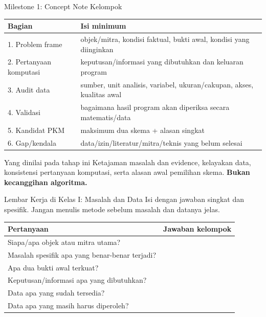 \documentclass[aspectratio=169,11pt]{beamer}
\begin{document}
\begin{frame}{Milestone 1: Concept Note Kelompok}
\small
\begin{center}
\begin{tabular}{p{4.0cm} p{9.0cm}}
\toprule
\textbf{Bagian} & \textbf{Isi minimum} \\
\midrule
1. Problem frame & objek/mitra, kondisi faktual, bukti awal, kondisi yang diinginkan \\
2. Pertanyaan komputasi & keputusan/informasi yang dibutuhkan dan keluaran program \\
3. Audit data & sumber, unit analisis, variabel, ukuran/cakupan, akses, kualitas awal \\
4. Validasi & bagaimana hasil program akan diperiksa secara matematis/data \\
5. Kandidat PKM & maksimum dua skema + alasan singkat \\
6. Gap/kendala & data/izin/literatur/mitra/teknis yang belum selesai \\
\bottomrule
\end{tabular}
\end{center}

\begin{alertblock}{Yang dinilai pada tahap ini}
\footnotesize
Ketajaman masalah dan evidence, kelayakan data, konsistensi pertanyaan komputasi, serta alasan awal pemilihan skema. \textbf{Bukan kecanggihan algoritma.}
\end{alertblock}
\end{frame}

\begin{frame}{Lembar Kerja di Kelas I: Masalah dan Data}
\footnotesize
Isi dengan jawaban singkat dan spesifik. Jangan menulis metode sebelum masalah dan datanya jelas.

\begin{center}
\renewcommand{\arraystretch}{1.15}
\begin{tabular}{p{5.2cm} p{7.7cm}}
\toprule
\textbf{Pertanyaan} & \textbf{Jawaban kelompok} \\
\midrule
Siapa/apa objek atau mitra utama? & \\
Masalah spesifik apa yang benar-benar terjadi? & \\
Apa dua bukti awal terkuat? & \\
Keputusan/informasi apa yang dibutuhkan? & \\
Data apa yang sudah tersedia? & \\
Data apa yang masih harus diperoleh? & \\
\bottomrule
\end{tabular}
\end{center}
\end{frame}
\end{document}
